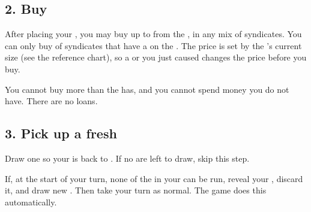 \subsection{2. Buy }
After placing your , you may buy up to   from the , in any mix of syndicates. You can only buy
 of syndicates that have a  on the . The price is set by the 's current size (see the reference
chart), so a  or  you just caused changes the price before you buy.

You cannot buy more than the  has, and you cannot spend money you do not have. There are no loans.


\subsection{3. Pick up a fresh }
Draw one  so your  is back to . If no  are left to draw, skip this step.

\begin{note}{\MakeUppercase{}}
If, at the start of your turn, none of the  in your  can be run, reveal your , discard it, and draw
 new . Then take your turn as normal. The game does this automatically.
\end{note}
